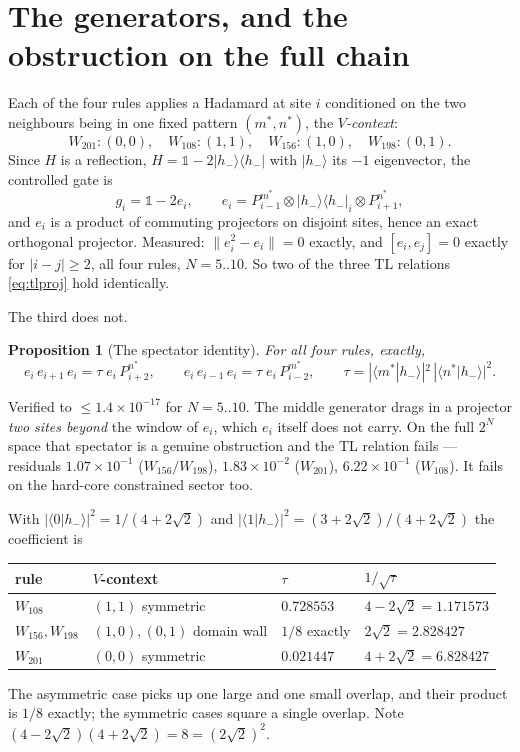 \documentclass[11pt]{article}
\theoremstyle{plain}
\newtheorem{proposition}{Proposition}
\theoremstyle{remark}
\begin{document}
\section{The generators, and the obstruction on the full chain}
\label{sec:obstruction}

Each of the four rules applies a Hadamard at site $i$ conditioned on the two
neighbours being in one fixed pattern $(m^*, n^*)$, the \emph{$V$-context}:
\[
  W_{201}: (0,0), \quad W_{108}: (1,1), \quad
  W_{156}: (1,0), \quad W_{198}: (0,1).
\]
Since $H$ is a reflection, $H = \mathbb{1} - 2|h_-\rangle\langle h_-|$ with
$|h_-\rangle$ its $-1$ eigenvector, the controlled gate is
\begin{equation}
  g_i = \mathbb{1} - 2 e_i, \qquad
  e_i = P^{m^*}_{i-1} \otimes |h_-\rangle\langle h_-|_i \otimes P^{n^*}_{i+1},
  \label{eq:gen}
\end{equation}
and $e_i$ is a product of commuting projectors on disjoint sites, hence an exact
orthogonal projector. Measured: $\lVert e_i^2 - e_i\rVert = 0$ exactly, and
$[e_i,e_j] = 0$ exactly for $|i-j| \ge 2$, all four rules, $N = 5..10$. So two of
the three TL relations \eqref{eq:tlproj} hold identically.

The third does not.

\begin{proposition}[The spectator identity]
\label{prop:spec}
For all four rules, exactly,
\[
  e_i\, e_{i+1}\, e_i = \tau\; e_i\, P^{n^*}_{i+2},
  \qquad
  e_i\, e_{i-1}\, e_i = \tau\; e_i\, P^{m^*}_{i-2},
  \qquad
  \tau = |\langle m^*|h_-\rangle|^2\,|\langle n^*|h_-\rangle|^2 .
\]
\end{proposition}

\noindent Verified to $\le 1.4\times10^{-17}$ for $N = 5..10$. The middle
generator drags in a projector \emph{two sites beyond} the window of $e_i$,
which $e_i$ itself does not carry. On the full $2^N$ space that spectator is a
genuine obstruction and the TL relation fails --- residuals $1.07\times10^{-1}$
($W_{156}/W_{198}$), $1.83\times10^{-2}$ ($W_{201}$), $6.22\times10^{-1}$
($W_{108}$). It fails on the hard-core constrained sector too.

With $|\langle 0|h_-\rangle|^2 = 1/(4+2\sqrt2)$ and
$|\langle 1|h_-\rangle|^2 = (3+2\sqrt2)/(4+2\sqrt2)$ the coefficient is
\begin{center}
\begin{tabular}{llll}
\toprule
rule & $V$-context & $\tau$ & $1/\sqrt\tau$ \\
\midrule
$W_{108}$ & $(1,1)$ symmetric & $0.728553$ & $4-2\sqrt2 = 1.171573$ \\
$W_{156}, W_{198}$ & $(1,0), (0,1)$ domain wall & $1/8$ exactly & $2\sqrt2 = 2.828427$ \\
$W_{201}$ & $(0,0)$ symmetric & $0.021447$ & $4+2\sqrt2 = 6.828427$ \\
\bottomrule
\end{tabular}
\end{center}
The asymmetric case picks up one large and one small overlap, and their product
is $1/8$ exactly; the symmetric cases square a single overlap. Note
$(4-2\sqrt2)(4+2\sqrt2) = 8 = (2\sqrt2)^2$.
\end{document}
